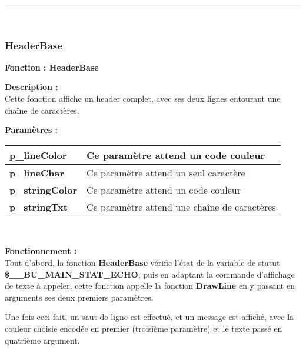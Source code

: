 \documentclass[a4paper,10pt]{article}
\begin{document}

\color{blue}\par\noindent\rule{\textwidth}{0.4pt}\color{white}\\[1\baselineskip]

\color{blue}
\subsubsection{HeaderBase}\color{white}

\textbf{Fonction : \color{mauve}HeaderBase\color{white}}\\[1\baselineskip]

\begin{justify}
    \textbf{Description :}\\
    Cette fonction affiche un header complet, avec ses deux lignes entourant une chaîne de caractères.
\end{justify}

\textbf{Paramètres :}\\[1\baselineskip]
\begin{tabular}{|l|l|}
\hline 
\textbf{\color{orange}p\_lineColor\color{white}} & Ce paramètre attend un code couleur \\ 
\hline 
\textbf{\color{orange}p\_lineChar\color{white}} & Ce paramètre attend un seul caractère \\ 
\hline 
\textbf{\color{orange}p\_stringColor\color{white}} & Ce paramètre attend un code couleur \\ 
\hline 
\textbf{\color{orange}p\_stringTxt\color{white}} & Ce paramètre attend une chaîne de caractères\\ 
\hline 
\end{tabular}\\[1\baselineskip]

\begin{justify}
    \textbf{Fonctionnement :}\\
    Tout d'abord, la fonction \textbf{\color{mauve}HeaderBase\color{white}} vérifie l'état de la variable de statut \textbf{\color{orange}\$\_\_BU\_MAIN\_STAT\_ECHO\color{white}}, puis en adaptant la commande d'affichage de texte à appeler, cette fonction appelle la fonction \textbf{\color{mauve}DrawLine\color{white}} en y passant en arguments ses deux premiers paramètres.
\end{justify}

\begin{justify}
    Une fois ceci fait, un saut de ligne est effectué, et un message est affiché, avec la couleur choisie encodée en premier (troisième paramètre) et le texte passé en quatrième argument.
\end{justify}
\end{document}
